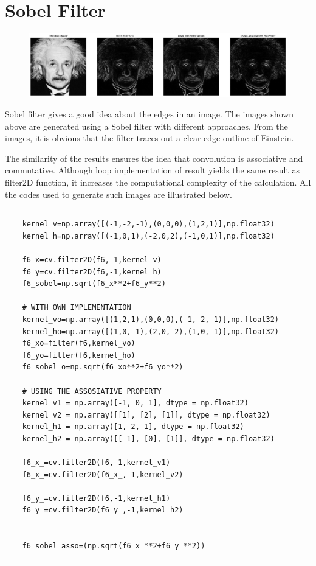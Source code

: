 \documentclass[12pt,a4paper]{article}
\begin{document}
\section{Sobel Filter}
\begin{figure}[h]
    \includegraphics[width=\textwidth]{q6.png}
    \centering
\end{figure}
Sobel filter gives a good idea about the edges in an image. The images shown above are generated using a Sobel filter with different approaches. From the images, it is obvious that the filter traces out a clear edge outline of Einstein.
\par
The similarity of the results ensures the idea that convolution is associative and commutative. Although loop implementation of result yields the same result as filter2D function, it increases the computational complexity of the calculation. All the codes used to generate such images are illustrated below.
\newpage
\rule{\textwidth}{0.4pt}
\begin{lstlisting}
    kernel_v=np.array([(-1,-2,-1),(0,0,0),(1,2,1)],np.float32)
    kernel_h=np.array([(-1,0,1),(-2,0,2),(-1,0,1)],np.float32)
    
    f6_x=cv.filter2D(f6,-1,kernel_v)
    f6_y=cv.filter2D(f6,-1,kernel_h)
    f6_sobel=np.sqrt(f6_x**2+f6_y**2)
    
    # WITH OWN IMPLEMENTATION
    kernel_vo=np.array([(1,2,1),(0,0,0),(-1,-2,-1)],np.float32)
    kernel_ho=np.array([(1,0,-1),(2,0,-2),(1,0,-1)],np.float32)
    f6_xo=filter(f6,kernel_vo)
    f6_yo=filter(f6,kernel_ho)
    f6_sobel_o=np.sqrt(f6_xo**2+f6_yo**2)
    
    # USING THE ASSOSIATIVE PROPERTY
    kernel_v1 = np.array([-1, 0, 1], dtype = np.float32)
    kernel_v2 = np.array([[1], [2], [1]], dtype = np.float32)
    kernel_h1 = np.array([1, 2, 1], dtype = np.float32)
    kernel_h2 = np.array([[-1], [0], [1]], dtype = np.float32)
    
    f6_x_=cv.filter2D(f6,-1,kernel_v1)
    f6_x_=cv.filter2D(f6_x_,-1,kernel_v2)
    
    f6_y_=cv.filter2D(f6,-1,kernel_h1)
    f6_y_=cv.filter2D(f6_y_,-1,kernel_h2)
    
    
    f6_sobel_asso=(np.sqrt(f6_x_**2+f6_y_**2))
\end{lstlisting}
\rule{\textwidth}{0.4pt}
\end{document}
